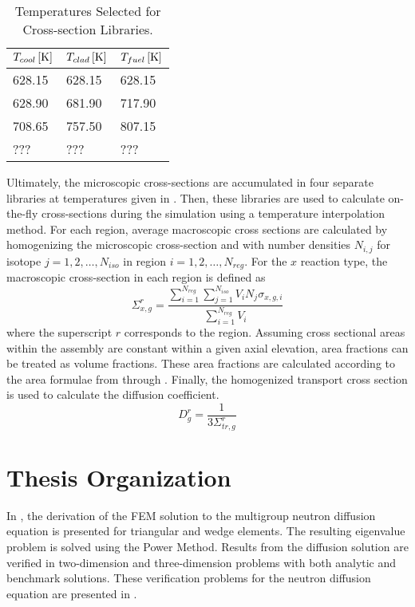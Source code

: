  \begin{table}
    \caption{Temperatures Selected for Cross-section Libraries.}
    \label{tab:xstemps}
    \begin{center}
      \begin{tabular}{lll}
        \toprule
        $T_{cool} \left[\text{{K}}\right]$ & $T_{clad} \left[\text{{K}}\right]$ & $T_{fuel} \left[\text{{K}}\right]$ \\
        \midrule
        628.15 & 628.15 & 628.15  \\
        628.90 & 681.90 & 717.90  \\
        708.65 & 757.50 & 807.15  \\
        ??? & ??? & ??? \\
        \bottomrule
      \end{tabular}
    \end{center}
  \end{table}

  Ultimately, the microscopic cross-sections are accumulated in four separate 
  libraries at temperatures given in . Then, these libraries 
  are used to calculate on-the-fly cross-sections during the simulation using a
  temperature interpolation method.
  For each region, average macroscopic cross
  sections are calculated by homogenizing the microscopic cross-section and with 
  number densities $N_{i,j}$ for isotope ${j=1,2,\ldots,N_{iso}}$ in region
  ${i=1,2,\ldots,N_{reg}}$.  For the $x$ reaction type, the 
  macroscopic cross-section in each region is defined as
  \begin{equation}
    \Sigma_{x,g}^r = \frac{\sum_{i=1}^{N_{reg}} \sum_{j=1}^{N_{iso}} V_i N_{j} 
      \sigma_{x,g,i}} {\sum_{i=1}^{N_{reg}}V_i}
  \end{equation}
  where the superscript $r$ corresponds to the region. Assuming cross sectional
  areas within the assembly are constant within a given axial elevation, area
  fractions can be treated as volume fractions. These area fractions are
  calculated according to the area formulae from  through
  . Finally, the homogenized transport cross section is used 
  to calculate the diffusion coefficient.
  \begin{equation}
    D_g^r = \frac{1}{3 \Sigma_{tr,g}^r}
  \end{equation}

\section{Thesis Organization}
  In , the derivation of the FEM solution to the
  multigroup neutron diffusion equation is
  presented for triangular and wedge elements. The resulting eigenvalue problem
  is solved using the Power Method. Results from the diffusion solution are
  verified in two-dimension and three-dimension problems with both analytic and
  benchmark solutions. These verification problems for the neutron diffusion
  equation are presented in .

